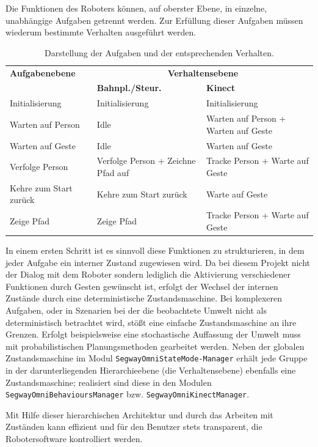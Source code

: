 Die Funktionen des Roboters können, auf oberster Ebene, in einzelne, unabhängige Aufgaben getrennt werden. Zur Erfüllung dieser Aufgaben müssen wiederum bestimmte Verhalten ausgeführt werden.
\begin{table}[h]
	\label{tab:integration_aufgaben}
	\centering
	\begin{tabular}{|p{3.7cm}|p{3cm}|p{3.2cm}|}
	\hline
	\textbf{Aufgabenebene}	&	\multicolumn{2}{c|}{\textbf{Verhaltensebene}}\\
		&	\textbf{Bahnpl./Steur.}	&	\textbf{Kinect}	\\
	\hline
	Initialisierung	&	Initialisierung	&	Initialisierung \\
	\hline
	Warten auf Person	&	Idle	&	Warten auf Person + Warten auf Geste \\
	\hline
	Warten auf Geste	&	Idle	&	Warten auf Geste \\
	\hline
	Verfolge Person	&	Verfolge Person + Zeichne Pfad auf	&	Tracke Person + Warte auf Geste \\
	\hline
	Kehre zum Start zurück	&	Kehre zum Start zurück	&	Warte auf Geste \\
	\hline
	Zeige Pfad	& Zeige Pfad	&	Tracke Person + Warte auf Geste \\
	\hline
	\end{tabular}
	\caption{Darstellung der Aufgaben und der entsprechenden Verhalten.}
\end{table}
In einem ersten Schritt ist es sinnvoll diese Funktionen zu strukturieren, in dem jeder Aufgabe ein 
interner Zustand zugewiesen wird. Da bei diesem Projekt nicht der Dialog mit dem Roboter sondern lediglich 
die Aktivierung verschiedener Funktionen durch Gesten gewünscht ist, erfolgt der Wechsel der internen 
Zustände durch eine deterministische Zustandsmaschine. Bei komplexeren 
Aufgaben, oder in Szenarien bei der die beobachtete Umwelt nicht als deterministisch betrachtet wird, stößt
eine einfache Zustandsmaschine an ihre Grenzen. Erfolgt beispielsweise eine stochastische Auffassung der Umwelt muss mit probabilistischen Planungsmethoden gearbeitet werden.
Neben der globalen Zustandsmaschine im Modul
\lstinline{SegwayOmniStateMode-Manager} erhält jede Gruppe in der darunterliegenden Hierarchieebene (die Verhaltensebene) ebenfalls eine Zustandsmaschine; 
realisiert sind diese in den Modulen \lstinline{SegwayOmniBehavioursManager} bzw. \lstinline{SegwayOmniKinectManager}.

Mit Hilfe dieser hierarchischen Architektur und durch das Arbeiten mit Zuständen kann effizient und für 
den Benutzer stets transparent, die Robotersoftware kontrolliert werden.

